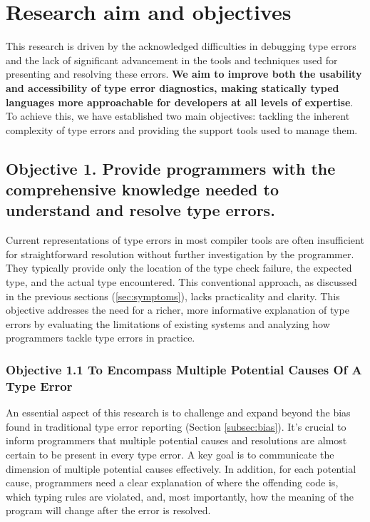 \section{Research aim and objectives}

This research is driven by the acknowledged difficulties in debugging type errors and the lack of significant advancement in the tools and techniques used for presenting and resolving these errors. \textbf{We aim to improve both the usability and accessibility of type error diagnostics, making statically typed languages more approachable for developers at all levels of expertise}. To achieve this, we have established two main objectives: tackling the inherent complexity of type errors and providing the support tools used to manage them.

\subsection{Objective 1. Provide programmers with the comprehensive knowledge needed to understand and resolve type errors.}
\label{subsec:aim1}

Current representations of type errors in most compiler tools are often insufficient for straightforward resolution without further investigation by the programmer. They typically provide only the location of the type check failure, the expected type, and the actual type encountered. This conventional approach, as discussed in the previous sections (\ref{sec:symptoms}), lacks practicality and clarity. This objective addresses the need for a richer, more informative explanation of type errors by evaluating the limitations of existing systems and analyzing how programmers tackle type errors in practice.

\subsubsection{Objective 1.1 To Encompass Multiple Potential Causes Of A Type Error}
An essential aspect of this research is to challenge and expand beyond the bias found in traditional type error reporting (Section \ref{subsec:bias}). It's crucial to inform programmers that multiple potential causes and resolutions are almost certain to be present in every type error. A key goal is to communicate the dimension of multiple potential causes effectively. In addition, for each potential cause, programmers need a clear explanation of where the offending code is, which typing rules are violated, and, most importantly, how the meaning of the program will change after the error is resolved.



